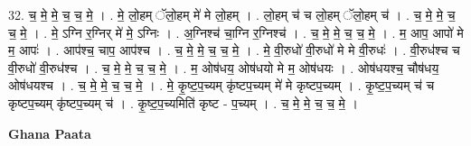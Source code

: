\documentclass[17pt]{extarticle}
\begin{document}
32. च॒ मे॒ मे॒ च॒ च॒ मे॒ । . मे॒ लो॒हम् ॅलो॒हम् मे॑ मे लो॒हम् । . लो॒हम् च॑ च लो॒हम् ॅलो॒हम् च॑ । . च॒ मे॒ मे॒ च॒ च॒ मे॒ । . मे॒ ऽग्नि र॒ग्निर् मे॑ मे॒ ऽग्निः । . अ॒ग्निश्च॑ चा॒ग्नि र॒ग्निश्च॑ । . च॒ मे॒ मे॒ च॒ च॒ मे॒ । . म॒ आप॒ आपो॑ मे म॒ आपः॑ । . आप॑श्च॒ चाप॒ आप॑श्च । . च॒ मे॒ मे॒ च॒ च॒ मे॒ । . मे॒ वी॒रुधो॑ वी॒रुधो॑ मे मे वी॒रुधः॑ । . वी॒रुध॑श्च च वी॒रुधो॑ वी॒रुध॑श्च । . च॒ मे॒ मे॒ च॒ च॒ मे॒ । . म॒ ओष॑धय॒ ओष॑धयो मे म॒ ओष॑धयः । . ओष॑धयश्च॒ चौष॑धय॒ ओष॑धयश्च । . च॒ मे॒ मे॒ च॒ च॒ मे॒ । . मे॒ कृ॒ष्ट॒प॒च्यम् कृ॑ष्टप॒च्यम् मे॑ मे कृष्टप॒च्यम् । . कृ॒ष्ट॒प॒च्यम् च॑ च कृष्टप॒च्यम् कृ॑ष्टप॒च्यम् च॑ । . कृ॒ष्ट॒प॒च्यमिति॑ कृष्ट - प॒च्यम् । . च॒ मे॒ मे॒ च॒ च॒ मे॒ । \newline

\textbf{Ghana Paata } \newline
\end{document}
